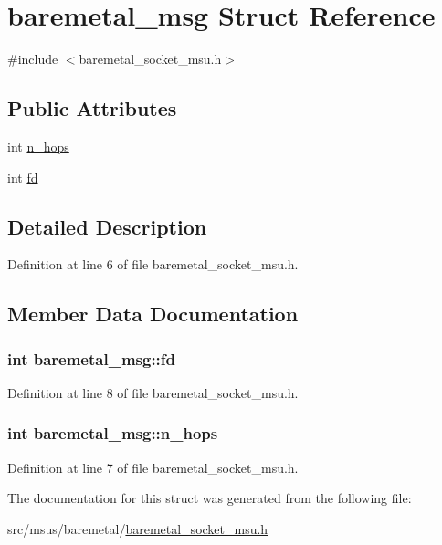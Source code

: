 \hypertarget{structbaremetal__msg}{\section{baremetal\-\_\-msg Struct Reference}
\label{structbaremetal__msg}
}


{\ttfamily \#include $<$baremetal\-\_\-socket\-\_\-msu.\-h$>$}

\subsection*{Public Attributes}
\begin{DoxyCompactItemize}
\item 
int \hyperlink{structbaremetal__msg_a08fd4a9ee73055ccabefb955e562f72c}{n\-\_\-hops}
\item 
int \hyperlink{structbaremetal__msg_a45b0c69ff6ec0452403022ea70dd39b5}{fd}
\end{DoxyCompactItemize}


\subsection{Detailed Description}


Definition at line 6 of file baremetal\-\_\-socket\-\_\-msu.\-h.



\subsection{Member Data Documentation}
\hypertarget{structbaremetal__msg_a45b0c69ff6ec0452403022ea70dd39b5}{
\subsubsection[{fd}]{\setlength{\rightskip}{0pt plus 5cm}int baremetal\-\_\-msg\-::fd}}\label{structbaremetal__msg_a45b0c69ff6ec0452403022ea70dd39b5}


Definition at line 8 of file baremetal\-\_\-socket\-\_\-msu.\-h.

\hypertarget{structbaremetal__msg_a08fd4a9ee73055ccabefb955e562f72c}{
\subsubsection[{n\-\_\-hops}]{\setlength{\rightskip}{0pt plus 5cm}int baremetal\-\_\-msg\-::n\-\_\-hops}}\label{structbaremetal__msg_a08fd4a9ee73055ccabefb955e562f72c}


Definition at line 7 of file baremetal\-\_\-socket\-\_\-msu.\-h.



The documentation for this struct was generated from the following file\-:\begin{DoxyCompactItemize}
\item 
src/msus/baremetal/\hyperlink{baremetal__socket__msu_8h}{baremetal\-\_\-socket\-\_\-msu.\-h}\end{DoxyCompactItemize}
